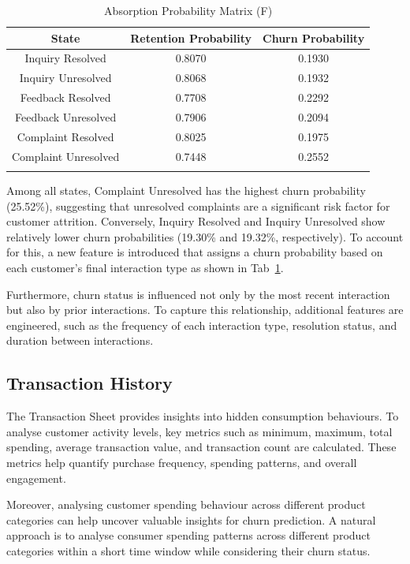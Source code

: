 \documentclass[journal=gmj]{CUP-JNL-DTM}%
\theoremstyle{definition}
\numberwithin{equation}{section}
\begin{document}
\begin{table}[h]
    \centering
    \begin{tabular}{c|c|c}
        \hline
        \textbf{State} & \textbf{Retention Probability} & \textbf{Churn Probability} \\
        \hline
        Inquiry Resolved & 0.8070 & 0.1930 \\
        Inquiry Unresolved & 0.8068 & 0.1932 \\
        Feedback Resolved & 0.7708 & 0.2292 \\
        Feedback Unresolved & 0.7906 & 0.2094 \\
        Complaint Resolved & 0.8025 & 0.1975 \\
        Complaint Unresolved & 0.7448 & 0.2552 \\
        \hline \\
    \end{tabular}
    \caption{Absorption Probability Matrix (F)}
    \label{tab:absorb_prob_matrix}
\end{table}

Among all states, Complaint Unresolved has the highest churn probability (25.52\%), suggesting that unresolved complaints are a significant risk factor for customer attrition. Conversely, Inquiry Resolved and Inquiry Unresolved show relatively lower churn probabilities (19.30\% and 19.32\%, respectively). To account for this, a new feature is introduced that assigns a churn probability based on each customer's final interaction type as shown in Tab~\ref{tab:absorb_prob_matrix}.

Furthermore, churn status is influenced not only by the most recent interaction but also by prior interactions. To capture this relationship, additional features are engineered, such as the frequency of each interaction type, resolution status, and duration between interactions.

\subsection{Transaction History}

The Transaction Sheet provides insights into hidden consumption behaviours. To analyse customer activity levels, key metrics such as minimum, maximum, total spending, average transaction value, and transaction count are calculated. These metrics help quantify purchase frequency, spending patterns, and overall engagement.

Moreover, analysing customer spending behaviour across different product categories can help uncover valuable insights for churn prediction. A natural approach is to analyse consumer spending patterns across different product categories within a short time window while considering their churn status. 
\end{document}
